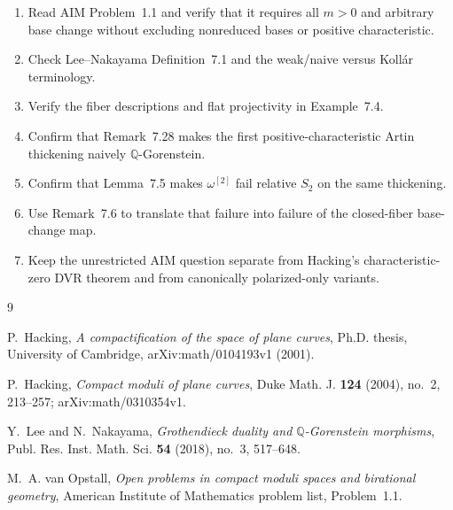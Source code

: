 \documentclass[10pt,reqno]{amsart}
\theoremstyle{definition}
\begin{document}
\begin{enumerate}
  \item Read AIM Problem~1.1 and verify that it requires all $m>0$ and arbitrary base change without excluding nonreduced bases or positive characteristic.
  \item Check Lee--Nakayama Definition~7.1 and the weak/naive versus Koll\'ar terminology.
  \item Verify the fiber descriptions and flat projectivity in Example~7.4.
  \item Confirm that Remark~7.28 makes the first positive-characteristic Artin thickening naively $\mathbb Q$-Gorenstein.
  \item Confirm that Lemma~7.5 makes $\omega^{[2]}$ fail relative $S_2$ on the same thickening.
  \item Use Remark~7.6 to translate that failure into failure of the closed-fiber base-change map.
  \item Keep the unrestricted AIM question separate from Hacking's characteristic-zero DVR theorem and from canonically polarized-only variants.
\end{enumerate}

\begin{thebibliography}{9}

P.~Hacking,
\emph{A compactification of the space of plane curves},
Ph.D. thesis, University of Cambridge, arXiv:math/0104193v1 (2001).

P.~Hacking,
\emph{Compact moduli of plane curves},
Duke Math. J. \textbf{124} (2004), no.~2, 213--257;
arXiv:math/0310354v1.

Y.~Lee and N.~Nakayama,
\emph{Grothendieck duality and $\mathbb Q$-Gorenstein morphisms},
Publ. Res. Inst. Math. Sci. \textbf{54} (2018), no.~3, 517--648.

M.~A. van Opstall,
\emph{Open problems in compact moduli spaces and birational geometry},
American Institute of Mathematics problem list, Problem~1.1.

\end{thebibliography}
\end{document}

